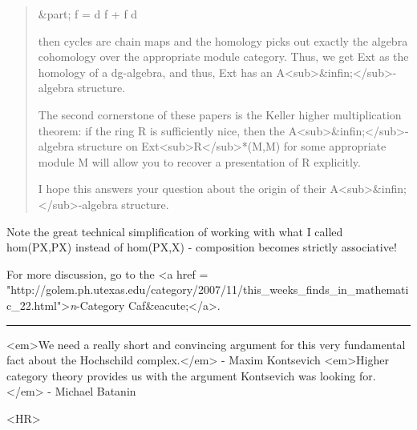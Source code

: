 \begin{quote}
   &part; f = d f + f d

   then cycles are chain maps and the homology picks out exactly the
   algebra cohomology over the appropriate module category. Thus, we 
   get Ext as the homology of a dg-algebra, and thus, Ext has an
   A<sub>&infin;</sub>-algebra structure.

   The second cornerstone of these papers is the Keller higher
   multiplication theorem: if the ring R is sufficiently nice, then 
   the A<sub>&infin;</sub>-algebra structure on Ext<sub>R</sub>*(M,M) for some 
   appropriate module M will allow you to recover a presentation of 
   R explicitly.

   I hope this answers your question about the origin of their
   A<sub>&infin;</sub>-algebra structure.
\end{quote}
    

Note the great technical simplification of working with what 
I called hom(PX,PX) instead of hom(PX,X) - composition becomes
strictly associative!



For more discussion, go to the
<a href = "http://golem.ph.utexas.edu/category/2007/11/this_weeks_finds_in_mathematic_22.html">\emph{n}-Category Caf&eacute;</a>.

\par\noindent\rule{\textwidth}{0.4pt}
<em>We need a really short and convincing argument for this very 
fundamental fact about the Hochschild complex.</em> - Maxim Kontsevich
<em>Higher category theory provides us with the argument Kontsevich
was looking for.</em> - Michael Batanin

<HR>



